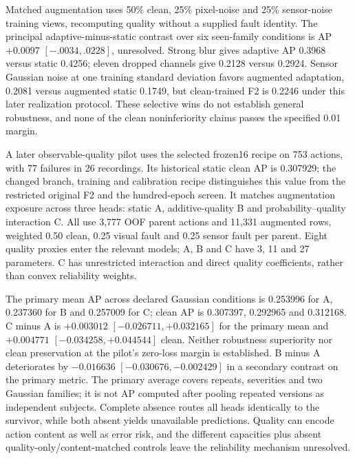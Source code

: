 Matched augmentation uses 50\% clean, 25\% pixel-noise and 25\% sensor-noise training
views, recomputing quality without a supplied fault identity. The principal
adaptive-minus-static contrast over six seen-family conditions is AP $+0.0097$
$[-.0034,.0228]$, unresolved. Strong blur gives adaptive AP 0.3968 versus static 0.4256;
eleven dropped channels give 0.2128 versus 0.2924. Sensor Gaussian noise at one training
standard deviation favors augmented adaptation, 0.2081 versus augmented static 0.1749,
but clean-trained F2 is 0.2246 under this later realization protocol. These selective
wins do not establish general robustness, and none of the clean noninferiority claims
passes the specified 0.01 margin.

A later observable-quality pilot uses the selected frozen16 recipe on 753 actions, with
77 failures in 26 recordings. Its historical static clean AP is 0.307929; the changed
branch, training and calibration recipe distinguishes this value from the restricted
original F2 and the hundred-epoch screen. It matches augmentation exposure across three
heads: static A, additive-quality B and probability--quality interaction C. All use
3,777 OOF parent actions and 11,331 augmented rows, weighted 0.50 clean, 0.25 visual
fault and 0.25 sensor fault per parent. Eight quality proxies enter the relevant models;
A, B and C have 3, 11 and 27 parameters. C has unrestricted interaction and direct
quality coefficients, rather than convex reliability weights.

The primary mean AP across declared Gaussian conditions is 0.253996 for A, 0.237360 for
B and 0.257009 for C; clean AP is 0.307397, 0.292965 and 0.312168. C minus A is
$+0.003012$ $[-0.026711,+0.032165]$ for the primary mean and $+0.004771$
$[-0.034258,+0.044544]$ clean. Neither robustness superiority nor clean preservation at
the pilot's zero-loss margin is established. B minus A deteriorates by $-0.016636$
$[-0.030676,-0.002429]$ in a secondary contrast on the primary metric. The primary
average covers repeats, severities and two Gaussian families; it is not AP computed
after pooling repeated versions as independent subjects. Complete absence routes all
heads identically to the survivor, while both absent yields unavailable predictions.
Quality can encode action content as well as error risk, and the different capacities
plus absent quality-only/content-matched controls leave the reliability mechanism
unresolved.

